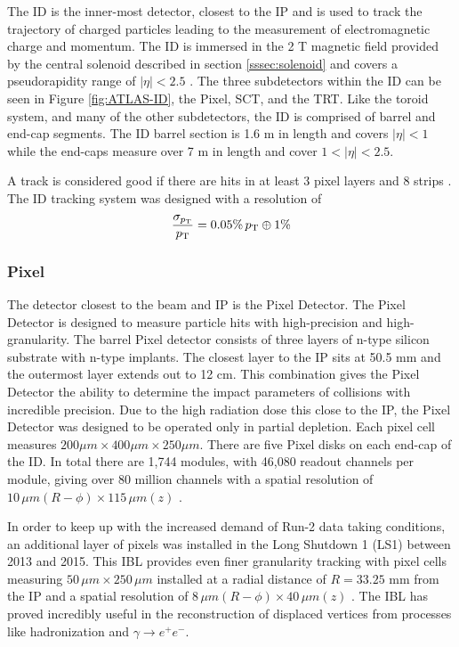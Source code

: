 		The \acrfull{ID} is the inner-most detector, closest to the \gls{IP} and is used to track the trajectory of charged particles leading to the measurement of electromagnetic charge and momentum. The \gls{ID} is immersed in the 2 T magnetic field provided by the central solenoid described in section \ref{sssec:solenoid} and covers a pseudorapidity range of $|\eta|<2.5$ \cite{ATLAS-ID}. The three subdetectors within the \gls{ID} can be seen in Figure \ref{fig:ATLAS-ID}, the Pixel, \gls{SCT}, and the \gls{TRT}. Like the toroid system, and many of the other subdetectors, the \gls{ID} is comprised of barrel and end-cap segments. The \gls{ID} barrel section is 1.6 m in length and covers $|\eta|<1$ while the end-caps measure over 7 m in length and cover $1 < |\eta| < 2.5$. 

		A track is considered good if there are hits in at least 3 pixel layers and 8 strips \cite{tracking-2012}. The ID tracking system was designed with a resolution of 
		\begin{equation}\label{eqn:tracking-resolution}
		\frac{\sigma_{p_{\text{T}}}}{p_{\text{T}}} = 0.05 \% \, p_{\text{T}} \oplus 1\%
		\end{equation}
	
		\subsubsection{Pixel}\label{sssec:pixel}
			The detector closest to the beam and \gls{IP} is the Pixel Detector. The Pixel Detector is designed to measure particle hits with high-precision and high-granularity. The barrel Pixel detector consists of three layers of n-type silicon substrate with n-type implants. The closest layer to the \gls{IP} sits at 50.5 mm and the outermost layer extends out to 12 cm. This combination gives the Pixel Detector the ability to determine the impact parameters of collisions with incredible precision. Due to the high radiation dose this close to the \gls{IP}, the Pixel Detector was designed to be operated only in partial depletion. Each pixel cell measures $200 \mu m \times 400 \mu m \times 250 \mu m$. There are five Pixel disks on each end-cap of the \gls{ID}. In total there are 1,744 modules, with 46,080 readout channels per module, giving over 80 million channels with a spatial resolution of $10 \, \mu m (R-\phi) \times 115 \, \mu m (z)$ \cite{ATLAS-pixel}. 

			In order to keep up with the increased demand of Run-2 data taking conditions, an additional layer of pixels was installed in the Long Shutdown 1 (LS1) between 2013 and 2015. This \gls{IBL} provides even finer granularity tracking with pixel cells measuring $50 \, \mu m \times 250 \, \mu m$ installed at a radial distance of $R=33.25$ mm from the \gls{IP} and a spatial resolution of $8 \, \mu m (R-\phi) \times 40 \, \mu m (z)$ \cite{ATLAS-IBL}. The \gls{IBL} has proved incredibly useful in the reconstruction of displaced vertices from processes like \bjet hadronization and $\gamma \rightarrow e^+ e^-$.


